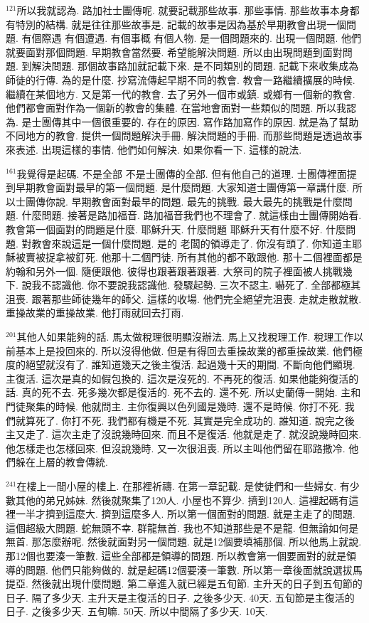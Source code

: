 \documentclass{book}
\begin{document}
$^{121}$所以我就認為.
路加社士團傳呢.
就要記載那些故事.
那些事情.
那些故事本身都有特別的結構.
就是往往那些故事是.
記載的故事是因為基於早期教會出現一個問題.
有個際遇 有個遭遇.
有個事概 有個人物.
是一個問題來的.
出現一個問題.
他們就要面對那個問題.
早期教會當然要.
希望能解決問題.
所以由出現問題到面對問題.
到解決問題.
那個故事路加就記載下來.
是不同類別的問題.
記載下來收集成為師徒的行傳.
為的是什麼.
抄寫流傳起早期不同的教會.
教會一路繼續擴展的時候.
繼續在某個地方.
又是第一代的教會.
去了另外一個市或鎮.
或鄉有一個新的教會.
他們都會面對作為一個新的教會的集體.
在當地會面對一些類似的問題.
所以我認為.
是士團傳其中一個很重要的.
存在的原因.
寫作路加寫作的原因.
就是為了幫助不同地方的教會.
提供一個問題解決手冊.
解決問題的手冊.
而那些問題是透過故事來表述.
出現這樣的事情.
他們如何解決.
如果你看一下.
這樣的說法.

$^{161}$我覺得是起碼.
不是全部 不是士團傳的全部.
但有他自己的道理.
士團傳裡面提到早期教會面對最早的第一個問題.
是什麼問題.
大家知道士團傳第一章講什麼.
所以士團傳你說.
早期教會面對最早的問題.
最先的挑戰.
最大最先的挑戰是什麼問題.
什麼問題.
接著是路加福音.
路加福音我們也不理會了.
就這樣由士團傳開始看.
教會第一個面對的問題是什麼.
耶穌升天.
什麼問題 耶穌升天有什麼不好.
什麼問題.
對教會來說這是一個什麼問題.
是的 老闆的領導走了.
你沒有頭了.
你知道主耶穌被賣被捉拿被釘死.
他那十二個門徒.
所有其他的都不敢跟他.
那十二個裡面都是約翰和另外一個.
隨便跟他.
彼得也跟著跟著跟著.
大祭司的院子裡面被人挑戰幾下.
說我不認識他.
你不要說我認識他.
發驟起勢.
三次不認主.
嚇死了.
全部都極其沮喪.
跟著那些師徒幾年的師父.
這樣的收場.
他們完全絕望完沮喪.
走就走散就散.
重操故業的重操故業.
他打雨就回去打雨.

$^{201}$其他人如果能夠的話.
馬太做稅理很明顯沒辦法.
馬上又找稅理工作.
稅理工作以前基本上是投回來的.
所以沒得他做.
但是有得回去重操故業的都重操故業.
他們極度的絕望就沒有了.
誰知道幾天之後主復活.
起過幾十天的期間.
不斷向他們顯現.
主復活.
這次是真的如假包換的.
這次是沒死的.
不再死的復活.
如果他能夠復活的話.
真的死不去.
死多幾次都是復活的.
死不去的.
還不死.
所以史蘭傳一開始.
主和門徒聚集的時候.
他就問主.
主你復興以色列國是幾時.
還不是時候.
你打不死.
我們就算死了.
你打不死.
我們都有機是不死.
其實是完全成功的.
誰知道.
說完之後主又走了.
這次主走了沒說幾時回來.
而且不是復活.
他就是走了.
就沒說幾時回來.
他怎樣走也怎樣回來.
但沒說幾時.
又一次很沮喪.
所以主叫他們留在耶路撒冷.
他們躲在上層的教會傳統.

$^{241}$在樓上一間小屋的樓上.
在那裡祈禱.
在第一章記載.
是使徒們和一些婦女.
有少數其他的弟兄姊妹.
然後就聚集了120人.
小屋也不算少.
擠到120人.
這裡起碼有這裡一半才擠到這麼大.
擠到這麼多人.
所以第一個面對的問題.
就是主走了的問題.
這個超級大問題.
蛇無頭不幸.
群龍無首.
我也不知道那些是不是龍.
但無論如何是無首.
那怎麼辦呢.
然後就面對另一個問題.
就是12個要填補那個.
所以他馬上就說.
那12個也要湊一筆數.
這些全部都是領導的問題.
所以教會第一個要面對的就是領導的問題.
他們只能夠做的.
就是起碼12個要湊一筆數.
所以第一章後面就說選拔馬提亞.
然後就出現什麼問題.
第二章進入就已經是五旬節.
主升天的日子到五旬節的日子.
隔了多少天.
主升天是主復活的日子.
之後多少天.
40天.
五旬節是主復活的日子.
之後多少天.
五旬嘛.
50天.
所以中間隔了多少天.
10天.
\end{document}
